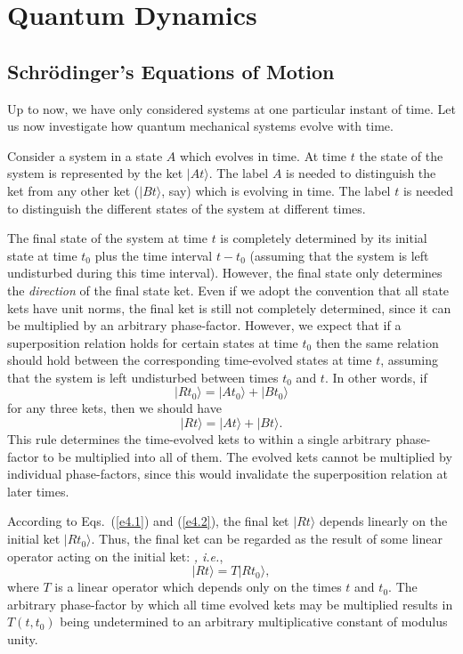\chapter{Quantum Dynamics}\label{s4}
\section{Schr\"{o}dinger's Equations of Motion}\label{s4.1}
Up to now, we have only considered systems at one particular instant of time. 
Let us now investigate how quantum mechanical systems evolve with time. 

Consider a system in a state $A$ which evolves in time. At time
$t$ the state of the system is represented by the ket $|At\rangle$. The label
$A$ is needed to distinguish the ket from any other ket ($|Bt\rangle$, say)
which is evolving in time. The label $t$ is needed to distinguish the different
states of the system at different times. 

The final state of the system at time $t$ is completely determined by its
initial state at time $t_0$ plus the time interval $t-t_0$ (assuming that 
the system is left undisturbed during this time interval). However, the
final state only determines the {\em direction} of the final state ket. 
Even if we adopt the convention that all state kets have unit norms,
the final ket is still not completely determined, since it can be multiplied
by an arbitrary
 phase-factor. However, we expect that if a superposition relation 
holds for certain states at time $t_0$ then the same relation
should hold between the corresponding time-evolved states at time $t$, assuming
that the system is left undisturbed between times $t_0$ and $t$.
In other words,
if
\begin{equation}\label{e4.1}
|Rt_0\rangle = |At_0\rangle + |B t_0\rangle
\end{equation}
for any three kets, then we should  have
\begin{equation}\label{e4.2}
|Rt\rangle = |At\rangle + |B t\rangle.
\end{equation}
This rule determines the time-evolved kets to within a single arbitrary phase-factor to be multiplied into all of them. The evolved kets cannot be multiplied
by individual phase-factors, since this would invalidate the superposition
relation at later times. 

According to Eqs.~(\ref{e4.1}) and (\ref{e4.2}), the final ket $|Rt\rangle$ depends linearly
on the initial ket $|Rt_0\rangle$. Thus, the final ket can be regarded as the
result of some linear operator acting on the initial ket: {\em, i.e.},
\begin{equation}\label{e4.3}
|Rt\rangle = T |Rt_0\rangle,
\end{equation}
where $T$ is a linear operator which depends only on the times $t$
and $t_0$. 
The arbitrary phase-factor by which all time evolved kets may be multiplied
results in $T(t, t_0)$ being undetermined to an arbitrary multiplicative constant
of modulus unity. 

